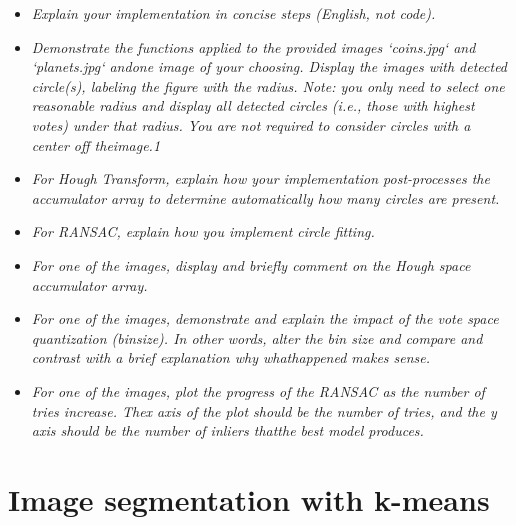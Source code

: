 \documentclass[11pt]{article}
\begin{document}
    \begin{itemize}
    \item \textit{Explain your implementation in concise steps (English, not code).}\newline

    \item \textit{Demonstrate the functions applied to the provided images ‘coins.jpg‘ and ‘planets.jpg‘ andone image of your choosing.
    Display the images with detected circle(s), labeling the figure with the radius. Note: you only need to select one reasonable radius and
    display all detected circles (i.e., those with highest votes) under that radius. You are not required to consider circles with a center off
    theimage.1}\newline

    \item \textit{For Hough Transform, explain how your implementation post-processes the
    accumulator array to determine automatically how many circles are present.}\newline

    \item \textit{For RANSAC, explain how you implement circle fitting.}\newline

    \item \textit{For one of the images, display and briefly comment on the Hough space accumulator array.}\newline

    \item \textit{For one of the images, demonstrate and explain the impact of the vote space quantization (binsize). In other words, alter
    the bin size and compare and contrast with a brief explanation why whathappened makes sense.}\newline

    \item \textit{For one of the images, plot the progress of the RANSAC as the number of tries increase. Thex axis
    of the plot should be
    the number of tries, and the y axis should be the number of inliers thatthe best model produces.}\newline

    \end{itemize}

    \section{Image segmentation with k-means}
\end{document}
